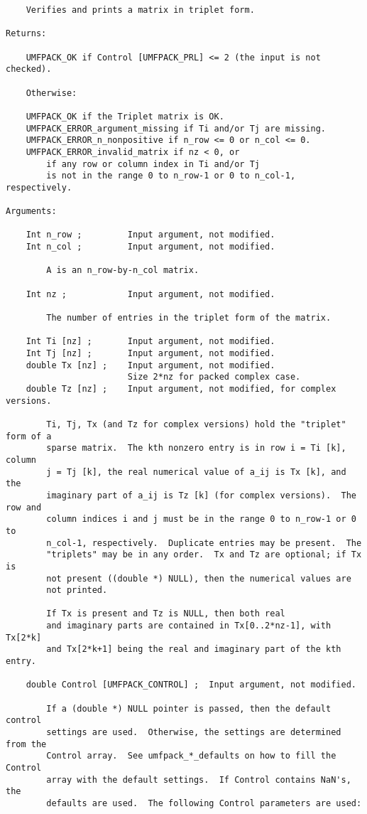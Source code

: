 \documentclass[11pt]{article}
\begin{document}
{\begin{verbatim}
    Verifies and prints a matrix in triplet form.

Returns:

    UMFPACK_OK if Control [UMFPACK_PRL] <= 2 (the input is not checked).

    Otherwise:

    UMFPACK_OK if the Triplet matrix is OK.
    UMFPACK_ERROR_argument_missing if Ti and/or Tj are missing.
    UMFPACK_ERROR_n_nonpositive if n_row <= 0 or n_col <= 0.
    UMFPACK_ERROR_invalid_matrix if nz < 0, or
        if any row or column index in Ti and/or Tj
        is not in the range 0 to n_row-1 or 0 to n_col-1, respectively.

Arguments:

    Int n_row ;         Input argument, not modified.
    Int n_col ;         Input argument, not modified.

        A is an n_row-by-n_col matrix.

    Int nz ;            Input argument, not modified.

        The number of entries in the triplet form of the matrix.

    Int Ti [nz] ;       Input argument, not modified.
    Int Tj [nz] ;       Input argument, not modified.
    double Tx [nz] ;    Input argument, not modified.
                        Size 2*nz for packed complex case.
    double Tz [nz] ;    Input argument, not modified, for complex versions.

        Ti, Tj, Tx (and Tz for complex versions) hold the "triplet" form of a
        sparse matrix.  The kth nonzero entry is in row i = Ti [k], column
        j = Tj [k], the real numerical value of a_ij is Tx [k], and the
        imaginary part of a_ij is Tz [k] (for complex versions).  The row and
        column indices i and j must be in the range 0 to n_row-1 or 0 to
        n_col-1, respectively.  Duplicate entries may be present.  The
        "triplets" may be in any order.  Tx and Tz are optional; if Tx is
        not present ((double *) NULL), then the numerical values are
        not printed.

        If Tx is present and Tz is NULL, then both real
        and imaginary parts are contained in Tx[0..2*nz-1], with Tx[2*k]
        and Tx[2*k+1] being the real and imaginary part of the kth entry.

    double Control [UMFPACK_CONTROL] ;  Input argument, not modified.

        If a (double *) NULL pointer is passed, then the default control
        settings are used.  Otherwise, the settings are determined from the
        Control array.  See umfpack_*_defaults on how to fill the Control
        array with the default settings.  If Control contains NaN's, the
        defaults are used.  The following Control parameters are used:


\end{verbatim}}
\end{document}
